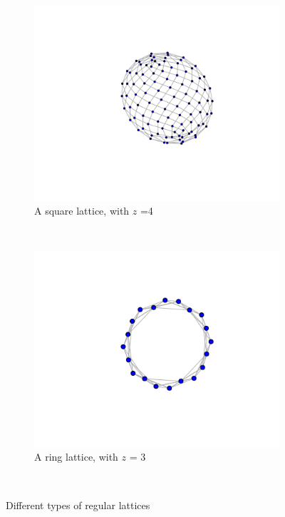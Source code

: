 \begin{figure}[h!]
    \centering
    \begin{subfigure}[b]{0.4\textwidth}
        \includegraphics[scale=0.6]{images/lattice1.png} 
        \caption{A square lattice, with $z$ =4}
        \label{fig:gull}
    \end{subfigure}
    ~ %
    \begin{subfigure}[b]{0.4\textwidth}
        \includegraphics[scale=0.6]{images/ringlattice.png} 
        \caption{A ring lattice, with $z$ = 3}
        \label{fig ring}
    \end{subfigure}
    ~ %
    \caption{Different types of regular lattices}\label{fig2222}
\end{figure}


